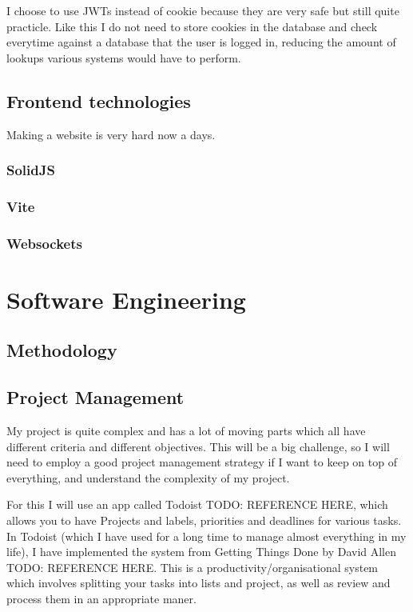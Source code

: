 \documentclass[titlepage]{article}
\begin{document}
I choose to use JWTs instead of cookie because they are very safe but still quite practicle. Like this I do not need to store cookies in the database and check everytime against a database that the user is logged in, reducing the amount of lookups various systems would have to perform.

\subsection{Frontend technologies}
Making a website is very hard now a days.

\subsubsection{SolidJS}

\subsubsection{Vite}

\subsubsection{Websockets}

\section{Software Engineering}

\subsection{Methodology}

\subsection{Project Management}
My project is quite complex and has a lot of moving parts which all have different criteria and different objectives. This will be a big challenge, so I will need to employ a good project management strategy if I want to keep on top of everything, and understand the complexity of my project.

For this I will use an app called Todoist TODO: REFERENCE HERE, which allows you to have Projects and labels, priorities and deadlines for various tasks. In Todoist (which I have used for a long time to manage almost everything in my life), I have implemented the system from Getting Things Done by David Allen TODO: REFERENCE HERE. This is a productivity/organisational system which involves splitting your tasks into lists and project, as well as review and process them in an appropriate maner.
\end{document}
